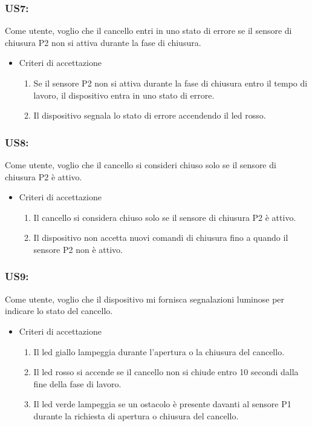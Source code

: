 \documentclass[12pt]{article}
\begin{document}
\subsubsection{US7:}
Come utente, voglio che il cancello entri in uno stato di errore se il sensore di chiusura P2 non si attiva durante la fase di chiusura.
\begin{itemize}
    \item Criteri di accettazione
    \begin{enumerate}
        \item Se il sensore P2 non si attiva durante la fase di chiusura entro il tempo di lavoro, il dispositivo entra in uno stato di errore.
        \item Il dispositivo segnala lo stato di errore accendendo il led rosso.
    \end{enumerate}
\end{itemize}
\subsubsection{US8:}
Come utente, voglio che il cancello si consideri chiuso solo se il sensore di chiusura P2 è attivo.
\begin{itemize}
    \item Criteri di accettazione
    \begin{enumerate}
        \item Il cancello si considera chiuso solo se il sensore di chiusura P2 è attivo.
        \item Il dispositivo non accetta nuovi comandi di chiusura fino a quando il sensore P2 non è attivo.
    \end{enumerate}
\end{itemize}
\subsubsection{US9:}
Come utente, voglio che il dispositivo mi fornisca segnalazioni luminose per indicare lo stato del cancello.
\begin{itemize}
    \item Criteri di accettazione
    \begin{enumerate}
        \item Il led giallo lampeggia durante l'apertura o la chiusura del cancello.
        \item Il led rosso si accende se il cancello non si chiude entro 10 secondi dalla fine della fase di lavoro.
        \item Il led verde lampeggia se un ostacolo è presente davanti al sensore P1 durante la richiesta di apertura o chiusura del cancello.
    \end{enumerate}
\end{itemize}
\newpage
\end{document}
